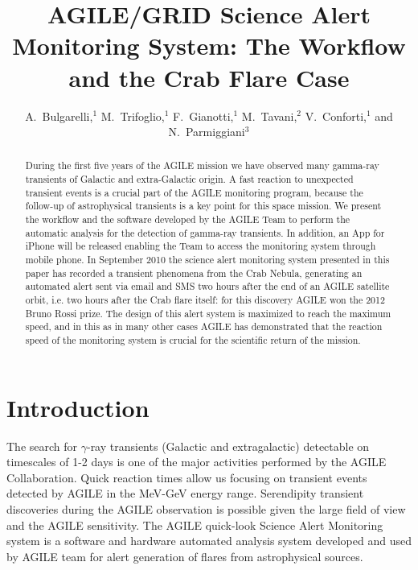 
\resetcounters


\title{AGILE/GRID Science Alert Monitoring System: The Workflow and the Crab Flare Case}
\author{A.~Bulgarelli,$^1$ M.~Trifoglio,$^1$ F.~Gianotti,$^1$ 
M.~Tavani,$^2$ V.~Conforti,$^1$ and N.~Parmiggiani$^3$
}


\begin{abstract}
During the first five years of the AGILE mission we have observed many gamma-ray transients of Galactic and extra-Galactic origin. A fast reaction to unexpected transient events is a crucial part of the AGILE monitoring program, because the follow-up of astrophysical transients is a key point for this space mission. We present the workflow and the software developed by the AGILE Team to perform the automatic analysis  for the detection of gamma-ray transients. In addition, an App for iPhone will be released enabling the  Team to access the monitoring system through mobile phone. In September 2010 the science alert monitoring system presented in this paper has recorded a transient phenomena from the Crab Nebula, generating an automated alert sent via email and SMS two hours after the end of an AGILE satellite orbit, i.e. two hours after the Crab flare itself: for this discovery AGILE won the 2012 Bruno Rossi prize. The design of this alert system is maximized to reach the maximum speed, and in this as in many other cases AGILE has demonstrated that the reaction speed of the monitoring system is crucial for the scientific return of the mission. 
\end{abstract}

\section{Introduction}
The search for $\gamma$-ray transients (Galactic and extragalactic)
      detectable on timescales of 1-2 days is one of the major
      activities performed by the AGILE Collaboration.
           Quick reaction times allow us focusing on transient events
          detected by AGILE in the MeV-GeV energy range. Serendipity
          transient discoveries during the AGILE observation is
          possible given the large field of view and the AGILE
          sensitivity.
          The AGILE quick-look Science Alert Monitoring system  is a software
          and hardware automated analysis system developed and used by
          AGILE team for alert generation of flares from astrophysical
          sources.
        
